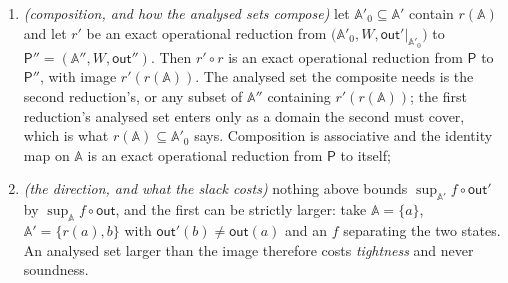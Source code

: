 \begin{lemma}
\begin{enumerate}[label=(\roman*),leftmargin=3.0em]
  existence, for each $k$, of \emph{some} exact operational reduction into
  $\mathbb{A}'_k$: let $W$ be one classical bit, $\mathbb{A}=\{a\}$,
  $\mathbb{A}'=\{b_1,b_2\}$ with $b_1\ne b_2$ and
  $\mathsf{out}(a)=\mathsf{out}'(b_1)=\mathsf{out}'(b_2)=\dyad{0}$, and
  $\mathbb{A}'_k=\{b_k\}$. Each $r_k\colon a\mapsto b_k$ is an exact
  operational reduction into $\mathbb{A}'_k$, the intersection is empty, so
  ``$f(\mathsf{out}'(b))\le0$ for every $b$ in the intersection'' holds
  vacuously; yet $f(\mathsf{out}(a))=1$ for
  $f(\rho)\coloneqq\tr[\dyad{0}\rho]$, so the conclusion of (i) is false for
  the intersection;
\item \emph{(composition, and how the analysed sets compose)} let
  $\mathbb{A}'_0\subseteq\mathbb{A}'$ contain $r(\mathbb{A})$ and let $r'$ be an
  exact operational reduction from
  $\big(\mathbb{A}'_0,W,\mathsf{out}'|_{\mathbb{A}'_0}\big)$ to
  $\mathsf{P}''=(\mathbb{A}'',W,\mathsf{out}'')$. Then $r'\circ r$ is an exact
  operational reduction from $\mathsf{P}$ to $\mathsf{P}''$, with image
  $r'(r(\mathbb{A}))$. The analysed set the composite needs is the second
  reduction's, or any subset of $\mathbb{A}''$ containing
  $r'(r(\mathbb{A}))$; the first reduction's analysed set enters only as a
  domain the second must cover, which is what
  $r(\mathbb{A})\subseteq\mathbb{A}'_0$ says. Composition is associative and
  the identity map on $\mathbb{A}$ is an exact operational reduction from
  $\mathsf{P}$ to itself;
\item \emph{(the direction, and what the slack costs)} nothing above bounds
  $\sup_{\mathbb{A}'}f\circ\mathsf{out}'$ by
  $\sup_{\mathbb{A}}f\circ\mathsf{out}$, and the first can be strictly larger:
  take $\mathbb{A}=\{a\}$, $\mathbb{A}'=\{r(a),b\}$ with
  $\mathsf{out}'(b)\ne\mathsf{out}(a)$ and an $f$ separating the two states.
  An analysed set larger than the image therefore costs \emph{tightness} and
  never soundness.
\end{enumerate}
\end{lemma}

